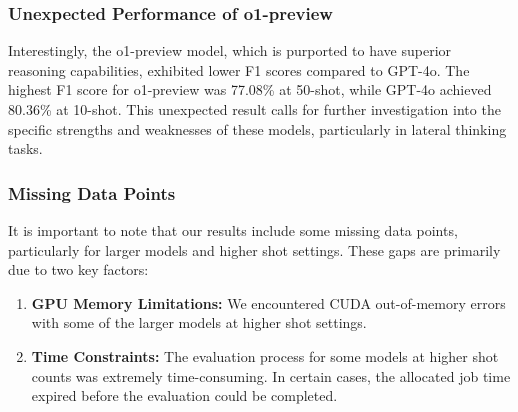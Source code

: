 \documentclass[conference]{IEEEtran}
\begin{document}
\subsubsection{Unexpected Performance of o1-preview}
Interestingly, the o1-preview model, which is purported to have superior reasoning capabilities, exhibited lower F1 scores compared to GPT-4o. The highest F1 score for o1-preview was 77.08\% at 50-shot, while GPT-4o achieved 80.36\% at 10-shot. This unexpected result calls for further investigation into the specific strengths and weaknesses of these models, particularly in lateral thinking tasks.


\subsubsection{Missing Data Points}
It is important to note that our results include some missing data points, particularly for larger models and higher shot settings. These gaps are primarily due to two key factors:

\begin{enumerate}
    \item \textbf{GPU Memory Limitations:} We encountered CUDA out-of-memory errors with some of the larger models at higher shot settings. %

    \item \textbf{Time Constraints:} The evaluation process for some models at higher shot counts was extremely time-consuming. In certain cases, the allocated job time expired before the evaluation could be completed. %
\end{enumerate}
\end{document}
